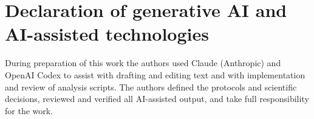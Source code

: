 \documentclass[journal]{IEEEtran}
\begin{document}
\section*{Declaration of generative AI and AI-assisted technologies}
During preparation of this work the authors used Claude (Anthropic) and OpenAI Codex to assist with drafting and editing text and with implementation and review of analysis scripts. The authors defined the protocols and scientific decisions, reviewed and verified all AI-assisted output, and take full responsibility for the work.




\end{document}
